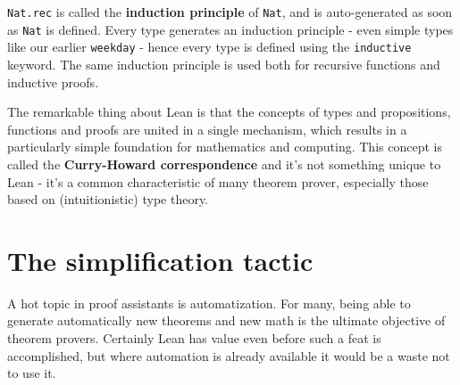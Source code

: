 \documentclass{book}
\theoremstyle{definition}
\theoremstyle{remark}
\theoremstyle{plain}
\begin{document}
\lstinline{Nat.rec} is called the \textbf{induction principle} of \lstinline{Nat},
and is auto-generated as soon as \lstinline{Nat} is defined.
Every type generates an induction principle - even simple types like our earlier \lstinline{weekday} -
hence every type is defined using the \lstinline{inductive} keyword.
The same induction principle is used both for recursive functions and inductive proofs.

The remarkable thing about Lean is that the concepts of types and propositions, functions and proofs are united in a single mechanism,
which results in a particularly simple foundation for mathematics and computing.
This concept is called the \textbf{Curry-Howard correspondence} and it's not something unique to Lean -
it's a common characteristic of many theorem prover, especially those based on (intuitionistic) type theory.

\section{The simplification tactic}

A hot topic in proof assistants is automatization.
For many, being able to generate automatically new theorems and new math is the ultimate objective of theorem provers.
Certainly Lean has value even before such a feat is accomplished,
but where automation is already available it would be a waste not to use it.
\end{document}
